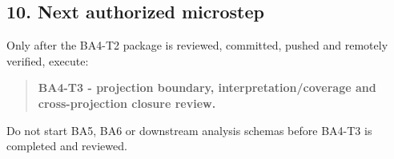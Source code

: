 \documentclass[11pt,a4paper]{article}
\begin{document}
\subsection{10. Next authorized
microstep}\label{10-next-authorized-microstep}

Only after the BA4-T2 package is reviewed, committed, pushed and
remotely verified, execute:

\begin{quote}
\textbf{BA4-T3 - projection boundary, interpretation/coverage and
cross-projection closure review.}
\end{quote}

Do not start BA5, BA6 or downstream analysis schemas before BA4-T3 is
completed and reviewed.
\end{document}
